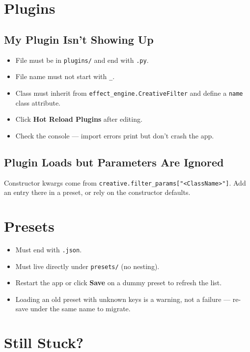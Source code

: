 \documentclass[11pt,a4paper,openany]{report}
\begin{document}
\section{Plugins}

\subsection{My Plugin Isn't Showing Up}

\begin{itemize}
    \item File must be in \texttt{plugins/} and end with \texttt{.py}.
    \item File name must not start with \texttt{\_}.
    \item Class must inherit from \texttt{effect\_engine.CreativeFilter}
        and define a \texttt{name} class attribute.
    \item Click \textbf{Hot Reload Plugins} after editing.
    \item Check the console --- import errors print but don't crash the app.
\end{itemize}

\subsection{Plugin Loads but Parameters Are Ignored}

Constructor kwargs come from
\texttt{creative.filter\_params["<ClassName>"]}. Add an entry there in a
preset, or rely on the constructor defaults.

\section{Presets}

\begin{itemize}
    \item Must end with \texttt{.json}.
    \item Must live directly under \texttt{presets/} (no nesting).
    \item Restart the app or click \textbf{Save} on a dummy preset to
        refresh the list.
    \item Loading an old preset with unknown keys is a warning, not a
        failure --- re-save under the same name to migrate.
\end{itemize}

\section{Still Stuck?}
\end{document}

